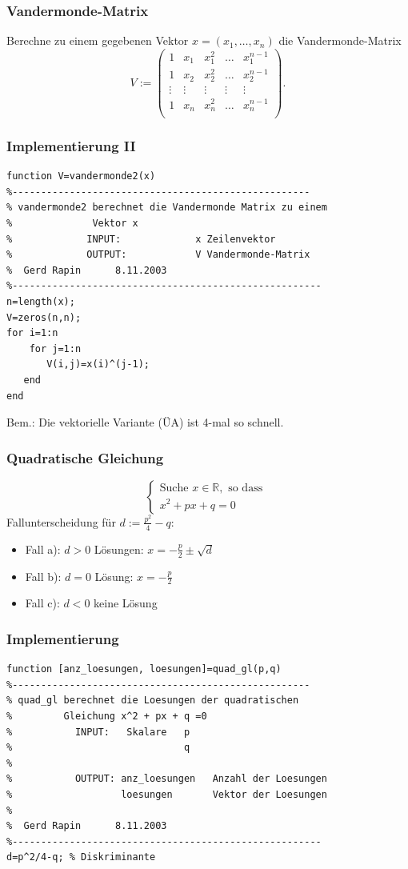 \begin{frame}[fragile]\frametitle{Vandermonde-Matrix }
Berechne zu einem gegebenen Vektor
  $x=(x_1, \dots ,x_n)$ die Vandermonde-Matrix
{ \[ V:= \left(\begin{array}{ccccc} 
1 & x_1 & x_1^2 & \hdots & x_1^{n-1}\\
1 & x_2 & x_2^2 & \hdots & x_2^{n-1}\\
\vdots & \vdots & \vdots & \vdots & \vdots\\
1 & x_n & x_n^2 & \hdots & x_n^{n-1}\\
\end{array} \right).  \]}
\end{frame}
%
%
%
\begin{frame}[fragile]\frametitle{Implementierung II}
\begin{lstlisting}
function V=vandermonde2(x)
%----------------------------------------------------
% vandermonde2 berechnet die Vandermonde Matrix zu einem
%              Vektor x
%             INPUT:             x Zeilenvektor 
%             OUTPUT:            V Vandermonde-Matrix
%  Gerd Rapin      8.11.2003
%------------------------------------------------------
n=length(x);
V=zeros(n,n);
for i=1:n
    for j=1:n
       V(i,j)=x(i)^(j-1);
   end
end
\end{lstlisting}
\alert{Bem.:} Die vektorielle Variante (\"UA) ist  4-mal  so schnell.
\end{frame}
%
%
%
\begin{frame}[fragile]\frametitle{Quadratische Gleichung}
\alert{ \[  \left\{ \begin{array}{l} \mbox{Suche }  x \in \mathbb{R},
 \mbox{ so dass } \\
 x^2+px +q =0  \end{array} \right. \]}
Fallunterscheidung für $d:=\frac{p^2}{4} -q$:
\begin{itemize}
\item  Fall a): \alert{ $d>0$}  Lösungen: $x=-\frac{p}{2} \pm \sqrt{d}$ \\
\item  Fall b): \alert{ $d=0$}  Lösung: $x=-\frac{p}{2}$\\
\item  Fall c): \alert{ $d<0$} \quad keine Lösung
\end{itemize}
\end{frame} 
%
%
%
\begin{frame}[fragile]\frametitle{Implementierung}
\begin{lstlisting}
function [anz_loesungen, loesungen]=quad_gl(p,q)
%----------------------------------------------------
% quad_gl berechnet die Loesungen der quadratischen   
%         Gleichung x^2 + px + q =0
%           INPUT:   Skalare   p
%                              q
%                 
%           OUTPUT: anz_loesungen   Anzahl der Loesungen
%                   loesungen       Vektor der Loesungen
%
%  Gerd Rapin      8.11.2003
%------------------------------------------------------
d=p^2/4-q; % Diskriminante


\end{lstlisting}
\end{frame}
